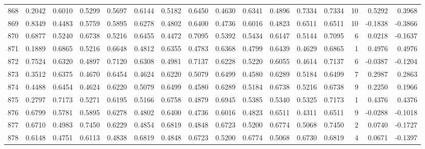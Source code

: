 \begin{tabular}{lrrrrrrrrrrrrrrr}
868 &      0.2042 &  0.6010 &  0.5299 &  0.5697 &  0.6144 &  0.5182 &  0.6450 &  0.4630 &  0.6341 &  0.4896 &   0.7334 &     0.7334 &     10 &                    0.5292 &                     0.3968 \\
869 &      0.8349 &  0.4483 &  0.5759 &  0.5895 &  0.6278 &  0.4802 &  0.6400 &  0.4736 &  0.6016 &  0.4823 &   0.6511 &     0.6511 &     10 &                   -0.1838 &                    -0.3866 \\
870 &      0.6877 &  0.5240 &  0.6738 &  0.5216 &  0.6455 &  0.4472 &  0.7095 &  0.5392 &  0.5434 &  0.6147 &   0.5144 &     0.7095 &      6 &                    0.0218 &                    -0.1637 \\
871 &      0.1889 &  0.6865 &  0.5216 &  0.6648 &  0.4812 &  0.6355 &  0.4783 &  0.6368 &  0.4799 &  0.6439 &   0.4629 &     0.6865 &      1 &                    0.4976 &                     0.4976 \\
872 &      0.7524 &  0.6320 &  0.4897 &  0.7120 &  0.6308 &  0.4981 &  0.7137 &  0.6228 &  0.5220 &  0.6055 &   0.4614 &     0.7137 &      6 &                   -0.0387 &                    -0.1204 \\
873 &      0.3512 &  0.6375 &  0.4670 &  0.6454 &  0.4624 &  0.6220 &  0.5079 &  0.6499 &  0.4580 &  0.6289 &   0.5184 &     0.6499 &      7 &                    0.2987 &                     0.2863 \\
874 &      0.4488 &  0.6454 &  0.4624 &  0.6220 &  0.5079 &  0.6499 &  0.4580 &  0.6289 &  0.5184 &  0.6738 &   0.5216 &     0.6738 &      9 &                    0.2250 &                     0.1966 \\
875 &      0.2797 &  0.7173 &  0.5271 &  0.6195 &  0.5166 &  0.6758 &  0.4879 &  0.6945 &  0.5385 &  0.5340 &   0.5325 &     0.7173 &      1 &                    0.4376 &                     0.4376 \\
876 &      0.6799 &  0.5781 &  0.5895 &  0.6278 &  0.4802 &  0.6400 &  0.4736 &  0.6016 &  0.4823 &  0.6511 &   0.4311 &     0.6511 &      9 &                   -0.0288 &                    -0.1018 \\
877 &      0.6710 &  0.4983 &  0.7450 &  0.6229 &  0.4854 &  0.6819 &  0.4848 &  0.6723 &  0.5200 &  0.6774 &   0.5068 &     0.7450 &      2 &                    0.0740 &                    -0.1727 \\
878 &      0.6148 &  0.4751 &  0.6113 &  0.4838 &  0.6819 &  0.4848 &  0.6723 &  0.5200 &  0.6774 &  0.5068 &   0.6730 &     0.6819 &      4 &                    0.0671 &                    -0.1397 \\

\end{tabular}
